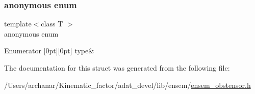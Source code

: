 \subsubsection{\texorpdfstring{anonymous enum}{anonymous enum}}
{\footnotesize\ttfamily template$<$class T $>$ \\
anonymous enum}

\begin{DoxyEnumFields}{Enumerator}
[0pt][0pt]{}\mbox{\label{structENSEM_1_1EnsbcIO_3_01OTensor_3_01T_01_4_01_4_af6d3d53de920c661d6c778736fdb1a46a64eda6fb88be434d1c8331318f02a60e}} 
type&\\
\hline

\end{DoxyEnumFields}


The documentation for this struct was generated from the following file\+:\begin{DoxyCompactItemize}
\item 
/\+Users/archanar/\+Kinematic\+\_\+factor/adat\+\_\+devel/lib/ensem/\mbox{\hyperlink{lib_2ensem_2ensem__obstensor_8h}{ensem\+\_\+obstensor.\+h}}\end{DoxyCompactItemize}
